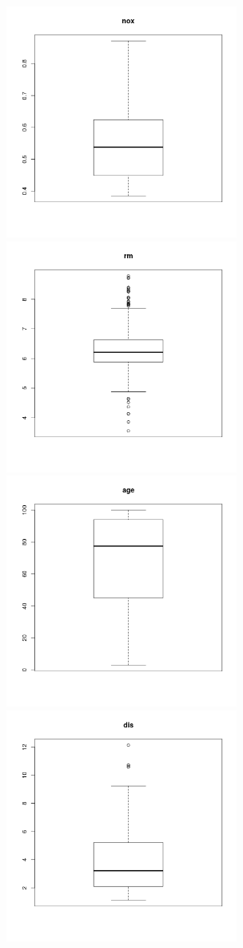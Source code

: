 \message{ !name(hw1.tex)}\documentclass{article}
\begin{document}
\includegraphics[width=3in]{5.png}
\includegraphics[width=3in]{6.png}
\includegraphics[width=3in]{7.png}
\includegraphics[width=3in]{8.png}
\end{document}
